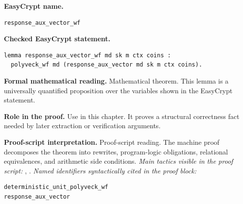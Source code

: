 \begin{formaltheorem}
\noindent\textbf{EasyCrypt name.}
\begin{lstlisting}[language=EasyCrypt,basicstyle=\ttfamily\scriptsize]
response_aux_vector_wf
\end{lstlisting}
\noindent\textbf{Checked EasyCrypt statement.}
\begin{lstlisting}[language=EasyCrypt,basicstyle=\ttfamily\scriptsize]
lemma response_aux_vector_wf md sk m ctx coins :
  polyveck_wf md (response_aux_vector md sk m ctx coins).
\end{lstlisting}
\noindent\textbf{Formal mathematical reading.}
Mathematical theorem. This lemma is a universally quantified proposition over the variables shown in the EasyCrypt statement.

\noindent\textbf{Role in the proof.}
Use in this chapter. It proves a structural correctness fact needed by later extraction or verification arguments.

\noindent\textbf{Proof-script interpretation.}
Proof-script reading. The machine proof decomposes the theorem into rewrites, program-logic obligations, relational equivalences, and arithmetic side conditions.
\emph{Main tactics visible in the proof script:} , .
\emph{Named identifiers syntactically cited in the proof block:}
\begin{lstlisting}[language=EasyCrypt,basicstyle=\ttfamily\scriptsize]
deterministic_unit_polyveck_wf
response_aux_vector
\end{lstlisting}

\end{formaltheorem}

